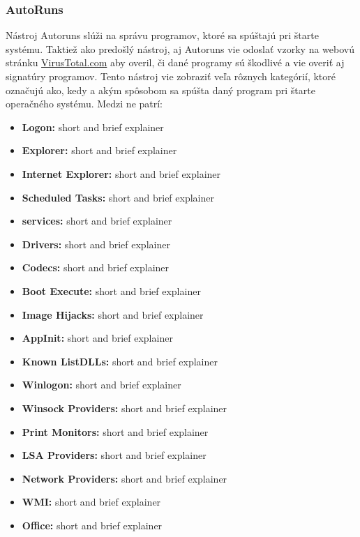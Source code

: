 \documentclass[conference]{IEEEtran}
\begin{document}
\subsubsection{AutoRuns}

Nástroj Autoruns slúži na správu programov, ktoré sa spúštajú pri štarte systému. Taktiež ako predošlý nástroj, aj Autoruns vie odoslať vzorky na webovú stránku \href{https://www.virustotal.com/gui/home/upload}{VirusTotal.com} aby overil, či dané programy sú škodlivé a vie overiť aj signatúry programov. Tento nástroj vie zobraziť veľa rôznych kategórií, ktoré označujú ako, kedy a akým spôsobom sa spúšta daný program pri štarte operačného systému. 
Medzi ne patrí:
\begin{itemize}
    \item \textbf{Logon:} short and brief explainer
    \item \textbf{Explorer:} short and brief explainer
    \item \textbf{Internet Explorer:} short and brief explainer
    \item \textbf{Scheduled Tasks:} short and brief explainer
    \item \textbf{services:} short and brief explainer
    \item \textbf{Drivers:} short and brief explainer
    \item \textbf{Codecs:} short and brief explainer
    \item \textbf{Boot Execute:} short and brief explainer
    \item \textbf{Image Hijacks:} short and brief explainer
    \item \textbf{AppInit:} short and brief explainer
    \item \textbf{Known ListDLLs:} short and brief explainer
    \item \textbf{Winlogon:} short and brief explainer
    \item \textbf{Winsock Providers:} short and brief explainer
    \item \textbf{Print Monitors:} short and brief explainer
    \item \textbf{LSA Providers:} short and brief explainer
    \item \textbf{Network Providers:} short and brief explainer
    \item \textbf{WMI:} short and brief explainer
    \item \textbf{Office:} short and brief explainer
\end{itemize}
\end{document}
